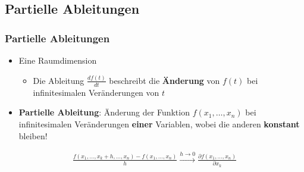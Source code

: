 
\subsection{Partielle Ableitungen}

\begin{frame}
    \frametitle{Partielle Ableitungen}

\begin{itemize}
    \item Eine Raumdimension
    \begin{itemize}
        \item Die Ableitung $\frac{df(t)}{dt}$ beschreibt die {\bf Änderung} von $f(t)$ bei infinitesimalen Veränderungen von $t$
    \end{itemize}
    \item {\bf Partielle Ableitung}: Änderung der Funktion $f(x_1,\ldots,x_n)$ bei infinitesimalen Veränderungen {\bf einer} Variablen, wobei die anderen {\bf konstant} bleiben!
\end{itemize}
    \begin{gather*}
        \frac{f(x_1,\ldots,x_k+h, \ldots, x_n) - f(x_1,\ldots, x_n)}{h} \xrightarrow{h \to 0} \frac{\partial f(x_1,\ldots,x_n)}{\partial x_k}  
    \end{gather*}
\end{frame}
 
